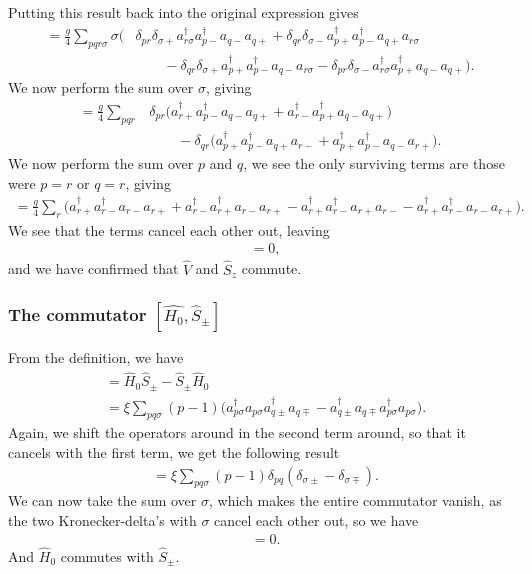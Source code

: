 \documentclass[a4paper, 11pt, notitlepage, english]{article}
\newcommand{\op}[1]{\hat{#1}}
\begin{document}
Putting this result back into the original expression gives
\begin{align*}
[\op{V}, \op{S}_z] = \frac{g}{4}\sum_{pqr\sigma} \sigma \big(&
\delta_{pr}\delta_{\sigma+} a_{r\sigma}^\dagger  a_{p-}^\dagger a_{q-}  a_{q+}
+ \delta_{qr}\delta_{\sigma-} a_{p+}^\dagger a_{p-}^\dagger a_{q+} a_{r\sigma}\\[-0.3cm]
&\qquad- \delta_{qr}\delta_{\sigma+} a_{p+}^\dagger a_{p-}^\dagger a_{q-} a_{r\sigma}  
- \delta_{pr} \delta_{\sigma -} a_{r\sigma}^\dagger  a_{p+}^\dagger a_{q-}  a_{q+} \big).
\end{align*}
We now perform the sum over $\sigma$, giving
\begin{align*}
[\op{V}, \op{S}_z] = \frac{g}{4}\sum_{pqr} &
\delta_{pr} \big(a_{r+}^\dagger  a_{p-}^\dagger a_{q-}  a_{q+} + a_{r-}^\dagger a_{p+}^\dagger a_{q-}  a_{q+} \big) \\[-0.3cm]
&\qquad - \delta_{qr} \big( a_{p+}^\dagger a_{p-}^\dagger a_{q+} a_{r-} + a_{p+}^\dagger a_{p-}^\dagger a_{q-} a_{r+} \big).
\end{align*}
We now perform the sum over $p$ and $q$, we see the only surviving terms are those were $p=r$ or $q=r$, giving
\begin{align*}
[\op{V}, \op{S}_z] = \frac{g}{4}\sum_{r} \big(
a_{r+}^\dagger  a_{r-}^\dagger a_{r-}  a_{r+} + a_{r-}^\dagger a_{r+}^\dagger a_{r-}  a_{r+}  -  a_{r+}^\dagger a_{r-}^\dagger a_{r+} a_{r-} - a_{r+}^\dagger a_{r-}^\dagger a_{r-} a_{r+} \big).
\end{align*}
We see that the terms cancel each other out, leaving
\begin{align*}
 [\op{V}, \op{S}_z] &= 0,
\end{align*}
and we have confirmed that $\op{V}$ and $\op{S}_z$ commute.

\clearpage

\subsubsection*{The commutator $[\op{H_0}, \op{S}_\pm]$}
From the definition, we have
\begin{align*}
[\op{H}_0, \op{S}_\pm] &= \op{H}_0\op{S}_\pm - \op{S}_\pm\op{H}_0 \\
&= 
\xi \sum_{pq \sigma} (p-1) \big( a_{p\sigma}^\dagger a_{p\sigma}  a_{q\pm}^\dagger a_{q\mp}       
- a_{q\pm}^\dagger a_{q\mp} a_{p\sigma}^\dagger a_{p\sigma}\big).
\end{align*}
Again, we shift the operators around in the second term around, so that it cancels with the first term, we get the following result
\begin{align*}
[\op{H}_0, \op{S}_\pm] &= \xi \sum_{pq \sigma} (p-1) \delta_{pq} (\delta_{\sigma \pm} - \delta_{\sigma \mp}).
\end{align*}
We can now take the sum over $\sigma$, which makes the entire commutator vanish, as the two Kronecker-delta's with $\sigma $ cancel each other out, so we have
\begin{align*}
[\op{H}_0, \op{S}_\pm] &= 0.
\end{align*}
And $\op{H}_0$ commutes with $\op{S}_\pm$.
\end{document}
